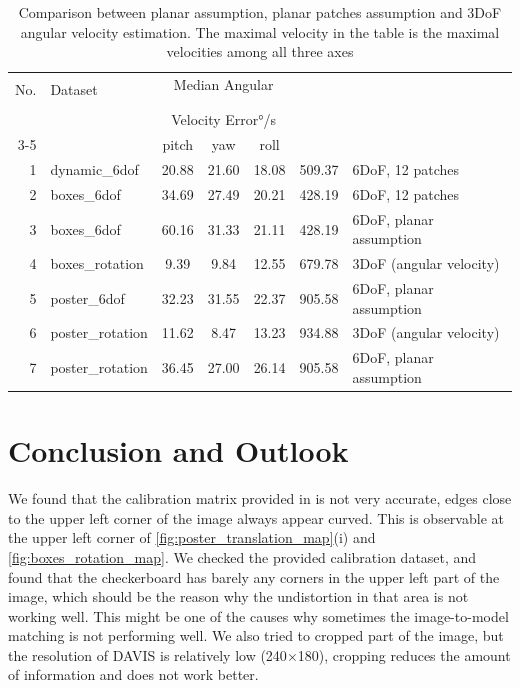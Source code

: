 \begin{table}[h]
  \begin{center}
    \begin{tabular}{rlccccl}
      \hline
      \multirow{3}{*}{No.}&\multirow{3}{*}{Dataset}&\multicolumn{3}{c}{Median Angular}&\multirowcell{3}{Maximal\\Velocity\\\si[per-mode=symbol]{\degree\per\second}}&\multirow{3}{*}{Parametrization}\\
                          &                     &\multicolumn{3}{c}{Velocity Error\si[per-mode=symbol]{\degree\per\second}}& &\\
      \cline{3-5}
                          &                    & pitch&  yaw & roll &          &                  \\
      \hline\hline
      1&dynamic\_6dof    & 20.88 & 21.60 & 18.08 & 509.37 & 6DoF, 12 patches \\
      2&boxes\_6dof      & 34.69 & 27.49 & 20.21 & 428.19 & 6DoF, 12 patches \\
      3&boxes\_6dof      & 60.16 & 31.33 & 21.11 & 428.19 & 6DoF, planar assumption \\
      4&boxes\_rotation  & 9.39 & 9.84 & 12.55 &679.78& 3DoF (angular velocity)\\
      5&poster\_6dof     & 32.23 & 31.55 & 22.37  & 905.58 & 6DoF, planar assumption\\
      6&poster\_rotation & 11.62 & 8.47  & 13.23  & 934.88 & 3DoF (angular velocity) \\
      7&poster\_rotation & 36.45 & 27.00 & 26.14 &905.58& 6DoF, planar assumption\\

      \hline
    \end{tabular}
  \end{center}
  \caption{Comparison between planar assumption, planar patches
    assumption and 3DoF angular velocity estimation. The maximal
    velocity in the table is the maximal velocities among all three
    axes}
  \label{tab:err_est_planar}
\end{table}

\label{sec:note}

\chapter{Conclusion and Outlook}
\label{chap:conclusion}

We found that the calibration matrix provided in
\citep{mueggler2017event} is not very accurate, edges close to the
upper left corner of the image always appear curved. This is
observable at the upper left corner of
\cref{fig:poster_translation_map}(i) and
\cref{fig:boxes_rotation_map}. We checked the provided calibration
dataset, and found that the checkerboard has barely any corners in the
upper left part of the image, which should be the reason why the
undistortion in that area is not working well. This might be one of
the causes why sometimes the image-to-model matching is not performing
well. We also tried to cropped part of the image, but the resolution
of DAVIS is relatively low (240$\times$180), cropping reduces the
amount of information and does not work better.

